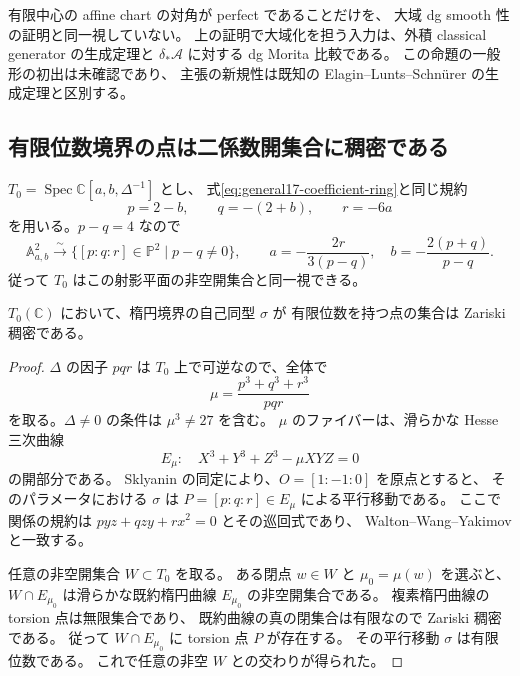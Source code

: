 \begin{remark}[局所対角と大域対角の役割]
有限中心の affine chart の対角が perfect であることだけを、
大域 dg smooth 性の証明と同一視していない。
上の証明で大域化を担う入力は、外積 classical generator の生成定理と
$\delta_*\mathscr A$ に対する dg Morita 比較である。
この命題の一般形の初出は未確認であり、
主張の新規性は既知の Elagin--Lunts--Schn\"urer の生成定理と区別する。
\end{remark}

\subsection{有限位数境界の点は二係数開集合に稠密である}

$T_0=\operatorname{Spec}\mathbb C[a,b,\Delta^{-1}]$ とし、
式\eqref{eq:general17-coefficient-ring}と同じ規約
\[
 p=2-b,\qquad q=-(2+b),\qquad r=-6a
\]
を用いる。$p-q=4$ なので
\[
 \mathbb A^2_{a,b}\xrightarrow{\sim}
 \{[p:q:r]\in\mathbb P^2\mid p-q\ne0\},
 \qquad
 a=-\frac{2r}{3(p-q)},\quad
 b=-\frac{2(p+q)}{p-q}.
\]
従って $T_0$ はこの射影平面の非空開集合と同一視できる。

\begin{lemma}
\label{lem:seed-torsion-boundary-dense}
$T_0(\mathbb C)$ において、楕円境界の自己同型 $\sigma$ が
有限位数を持つ点の集合は Zariski 稠密である。
\end{lemma}

\begin{proof}
$\Delta$ の因子 $pqr$ は $T_0$ 上で可逆なので、全体で
\[
 \mu=\frac{p^3+q^3+r^3}{pqr}
\]
を取る。$\Delta\ne0$ の条件は $\mu^3\ne27$ を含む。
$\mu$ のファイバーは、滑らかな Hesse 三次曲線
\[
 E_\mu:\quad X^3+Y^3+Z^3-\mu XYZ=0
\]
の開部分である。
Sklyanin の同定により、$O=[1:-1:0]$ を原点とすると、
そのパラメータにおける $\sigma$ は
$P=[p:q:r]\in E_\mu$ による平行移動である。
ここで関係の規約は
$pyz+qzy+rx^2=0$ とその巡回式であり、
Walton--Wang--Yakimov\cite[Definition--Lemma~2.13]{WWYSklyaninPoisson}と一致する。

任意の非空開集合 $W\subset T_0$ を取る。
ある閉点 $w\in W$ と $\mu_0=\mu(w)$ を選ぶと、
$W\cap E_{\mu_0}$ は滑らかな既約楕円曲線 $E_{\mu_0}$ の非空開集合である。
複素楕円曲線の torsion 点は無限集合であり、
既約曲線の真の閉集合は有限なので Zariski 稠密である。
従って $W\cap E_{\mu_0}$ に torsion 点 $P$ が存在する。
その平行移動 $\sigma$ は有限位数である。
これで任意の非空 $W$ との交わりが得られた。
\end{proof}

